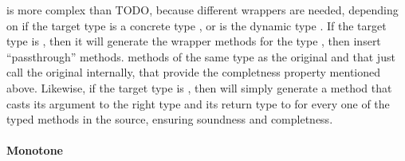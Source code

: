 \documentclass[a4paper,USenglish]{tex/lipics-v2016}
\begin{document}
\wc is more complex than TODO, because different wrappers are needed, depending on if the target type is a concrete type \C, or is the dynamic type \any. If the target type is \C, then it will generate the wrapper methods for the type \C, then insert ``passthrough'' methods. methods of the same type as the original and that just call the original internally, that provide the completness property mentioned above. Likewise, if the target type is \any, then \wc will simply generate a method that casts its argument to the right type and its return type to \any for every one of the typed methods in the source, ensuring soundness and completness.


\paragraph{Monotone}






\end{document}

